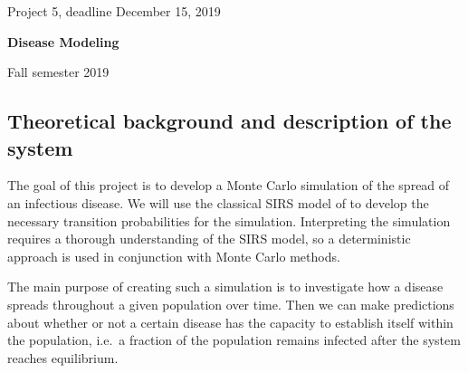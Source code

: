 \documentclass[%
oneside,                 %
final,                   %
10pt]{article}
\begin{document}

\newcommand{\exercisesection}[1]{\subsection*{#1}}






\thispagestyle{empty}

\begin{center}
{\LARGE\bf
\begin{spacing}{1.25}
Project 5, deadline  December 15, 2019
\end{spacing}
}
\end{center}


\begin{center}
{\bf Disease Modeling${}^{}$} \\ [0mm]
\end{center}

\begin{center}
\end{center}
    

\begin{center}
Fall semester 2019
\end{center}

\vspace{1cm}


\subsection{Theoretical background and description of the system}

The goal of this project is to develop a Monte Carlo simulation of
the spread of an infectious disease. We will use the classical SIRS model of
to develop the necessary transition
probabilities for the simulation. Interpreting the simulation requires
a thorough understanding of the SIRS model, so a deterministic
approach is used in conjunction with Monte Carlo methods. 

The main purpose of creating such a simulation is to investigate how a
disease spreads throughout a given population over time. Then we can
make predictions about whether or not a certain disease has the
capacity to establish itself within the population, i.e.~a fraction of
the population remains infected after the system reaches
equilibrium. 
\end{document}
